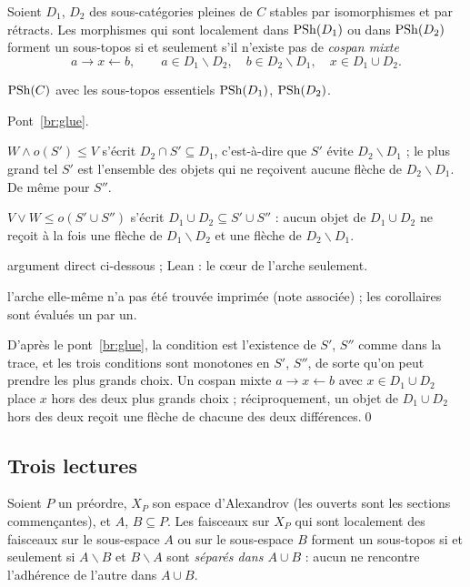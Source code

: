 \begin{theorem}\label{th:cospan}
Soient $D_1$, $D_2$ des sous-catégories pleines de $C$ stables par isomorphismes et par rétracts. Les morphismes qui sont localement dans $\mathrm{PSh}(D_1)$ ou dans $\mathrm{PSh}(D_2)$ forment un sous-topos si et seulement s'il n'existe pas de \emph{cospan mixte}
\[
a\longrightarrow x\longleftarrow b,\qquad a\in D_1\smallsetminus D_2,\quad b\in D_2\smallsetminus D_1,\quad x\in D_1\cup D_2.
\]
\end{theorem}

\begin{trace}
\item[tablier] $\mathrm{PSh}(C)$ avec les sous-topos essentiels $\mathrm{PSh}(D_1)$, $\mathrm{PSh}(D_2)$.
\item[arche] Pont~\ref{br:glue}.
\item[spécialiser] $W\wedge o(S')\le V$ s'écrit $D_2\cap S'\subseteq D_1$, c'est-à-dire que $S'$ évite $D_2\smallsetminus D_1$ ; le plus grand tel $S'$ est l'ensemble des objets qui ne reçoivent aucune flèche de $D_2\smallsetminus D_1$. De même pour $S''$.
\item[réécrire] $V\vee W\le o(S'\cup S'')$ s'écrit $D_1\cup D_2\subseteq S'\cup S''$ : aucun objet de $D_1\cup D_2$ ne reçoit à la fois une flèche de $D_1\smallsetminus D_2$ et une flèche de $D_2\smallsetminus D_1$.
\item[vérifier] argument direct ci-dessous ; Lean : le cœur de l'arche seulement.
\item[nouveauté] l'arche elle-même n'a pas été trouvée imprimée (note associée) ; les corollaires sont évalués un par un.
\end{trace}

\direct{} D'après le pont~\ref{br:glue}, la condition est l'existence de $S'$, $S''$ comme dans la trace, et les trois conditions sont monotones en $S'$, $S''$, de sorte qu'on peut prendre les plus grands choix. Un cospan mixte $a\to x\leftarrow b$ avec $x\in D_1\cup D_2$ place $x$ hors des deux plus grands choix ; réciproquement, un objet de $D_1\cup D_2$ hors des deux reçoit une flèche de chacune des deux différences.\qed

\subsection{Trois lectures}

\begin{corollary}\label{co:alex}
Soient $P$ un préordre, $X_P$ son espace d'Alexandrov (les ouverts sont les sections commençantes), et $A$, $B\subseteq P$. Les faisceaux sur $X_P$ qui sont localement des faisceaux sur le sous-espace $A$ ou sur le sous-espace $B$ forment un sous-topos si et seulement si $A\smallsetminus B$ et $B\smallsetminus A$ sont \emph{séparés dans $A\cup B$} : aucun ne rencontre l'adhérence de l'autre dans $A\cup B$.
\end{corollary}

